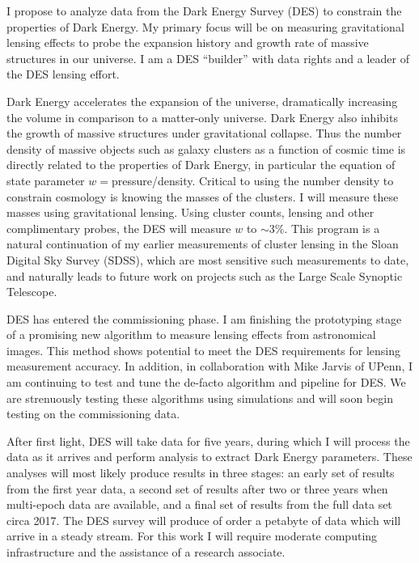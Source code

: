 \documentclass[12pt]{article}
\begin{document}

I propose to analyze data from the Dark Energy Survey (DES) to constrain the
properties of Dark Energy.  My primary focus will be on measuring gravitational
lensing effects to probe the expansion history and growth rate of massive
structures in our universe.  I am a DES ``builder'' with data rights and a
leader of the DES lensing effort.

Dark Energy accelerates the expansion of the universe, dramatically increasing
the volume in comparison to a matter-only universe.  Dark Energy also inhibits
the growth of massive structures under gravitational collapse.  Thus the number
density of massive objects such as galaxy clusters as a function of cosmic time
is directly related to the properties of Dark Energy, in particular the
equation of state parameter $w=$pressure/density.  Critical to using the number
density to constrain cosmology is knowing the masses of the clusters. I will
measure these masses using gravitational lensing.  Using cluster counts,
lensing and other complimentary probes, the DES will measure $w$ to $\sim$3\%.
This program is a natural continuation of my earlier measurements of cluster
lensing in the Sloan Digital Sky Survey (SDSS), which are most sensitive such
measurements to date, and naturally leads to future work on projects such as
the Large Scale Synoptic Telescope\cite{lsstweb}.

DES has entered the commissioning phase.  I am finishing the prototyping stage
of a promising new algorithm to measure lensing effects from astronomical
images.  This method shows potential to meet the DES requirements for lensing
measurement accuracy. In addition, in collaboration with Mike Jarvis of UPenn,
I am continuing to test and tune the de-facto algorithm and pipeline for DES.
We are strenuously testing these algorithms using simulations and will soon
begin testing on the commissioning data.

After first light, DES will take data for five years, during which I will
process the data as it arrives and perform analysis to extract Dark Energy
parameters.  These analyses will most likely produce results in three stages:
an early set of results from the first year data, a second set of results after
two or three years when multi-epoch data are available, and a final set of
results from the full data set circa 2017.  The DES survey will produce of
order a petabyte of data which will arrive in a steady stream.  For this work I
will require moderate computing infrastructure and the assistance of a research
associate.
\end{document}
